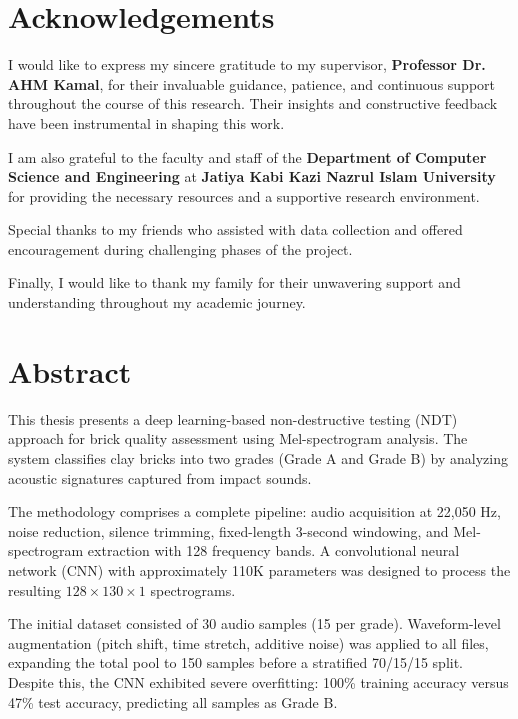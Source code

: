 \documentclass[12pt,a4paper,oneside]{report}
\begin{document}
\chapter*{Acknowledgements}

I would like to express my sincere gratitude to my supervisor, \textbf{Professor Dr. AHM Kamal}, for their invaluable guidance, patience, and continuous support throughout the course of this research. Their insights and constructive feedback have been instrumental in shaping this work.

I am also grateful to the faculty and staff of the \textbf{Department of Computer Science and Engineering} at \textbf{Jatiya Kabi Kazi Nazrul Islam University} for providing the necessary resources and a supportive research environment.

Special thanks to my friends who assisted with data collection and offered encouragement during challenging phases of the project.

Finally, I would like to thank my family for their unwavering support and understanding throughout my academic journey.

\newpage

\chapter*{Abstract}

This thesis presents a deep learning-based non-destructive testing (NDT) approach for brick quality assessment using Mel-spectrogram analysis. The system classifies clay bricks into two grades (Grade A and Grade B) by analyzing acoustic signatures captured from impact sounds.

The methodology comprises a complete pipeline: audio acquisition at 22,050 Hz, noise reduction, silence trimming, fixed-length 3-second windowing, and Mel-spectrogram extraction with 128 frequency bands. A convolutional neural network (CNN) with approximately 110K parameters was designed to process the resulting \(128 \times 130 \times 1\) spectrograms.

The initial dataset consisted of 30 audio samples (15 per grade). Waveform-level augmentation (pitch shift, time stretch, additive noise) was applied to all files, expanding the total pool to 150 samples before a stratified 70/15/15 split. Despite this, the CNN exhibited severe overfitting: 100\% training accuracy versus 47\% test accuracy, predicting all samples as Grade B.
\end{document}
